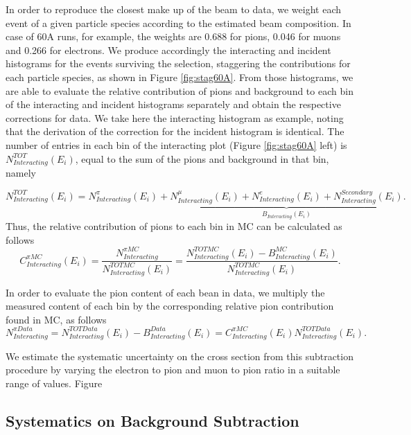 In order to reproduce the closest make up of the beam to data, we weight each event of a given particle species according to the estimated beam composition. In case of 60A runs, for example, the weights are 0.688 for pions,  0.046 for muons  and 0.266 for electrons.
We produce accordingly the interacting and incident histograms for the events surviving the selection, staggering the contributions for each particle species, as shown in Figure  \ref{fig:stag60A}. From those histograms, we are able to evaluate the relative contribution of  pions and  background to each bin of the interacting and incident histograms separately and obtain the respective corrections for data. We take here the interacting histogram as example, noting that the derivation of the correction for the incident histogram is identical. The number of entries in each bin of the interacting plot (Figure \ref{fig:stag60A} left) is  $N^{TOT}_{Interacting} (E_{i})$, equal to the sum of the pions and background in that bin, namely

\begin{equation}
N^{TOT}_{Interacting} (E_{i}) =  N^\pi_{Interacting} (E_{i}) + \underbrace{ N^\mu_{Interacting} (E_{i}) + N^e_{Interacting} (E_{i}) + N^{Secondary}_{Interacting} (E_{i}) }_{B_{Interacting} (E_i)}.
\end{equation}
Thus, the relative contribution of pions to each bin in MC can be calculated as follows
\begin{equation}
C^{\pi MC}_{Interacting} (E_{i}) =  \frac{N^{\pi MC}_{Interacting}}{ N^{TOT MC}_{Interacting} (E_{i}) } =    \frac{N^{TOT MC}_{Interacting} (E_{i}) - B^ {MC}_{Interacting} (E_i)}{ N^{TOT MC}_{Interacting} (E_{i})}.
\end{equation}


In order to evaluate the pion content of each bean in data, we multiply the measured content of each bin by the corresponding relative pion contribution found in MC, as follows
\begin{equation}
N^{\pi Data}_{Interacting} = N^{TOT Data}_{Interacting} (E_{i}) - B^{Data}_{Interacting} (E_i)  =  C^{\pi MC}_{Interacting} (E_{i}) N^{TOT Data}_{Interacting} (E_{i}).
\end{equation}


We estimate the systematic uncertainty on the cross section from this subtraction procedure by varying the electron to pion and muon to pion ratio in a suitable range of values. Figure  


\subsection{Systematics on Background Subtraction}\label{sec:beamSys}



